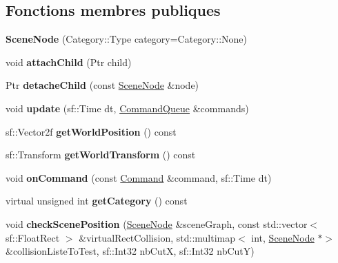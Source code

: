\subsection*{Fonctions membres publiques}
\begin{DoxyCompactItemize}
\item 
\hypertarget{class_scene_node_ae6066cf0e6c0bddbc06e6d09bac918e9}{}\label{class_scene_node_ae6066cf0e6c0bddbc06e6d09bac918e9} 
{\bfseries Scene\+Node} (Category\+::\+Type category=Category\+::\+None)
\item 
\hypertarget{class_scene_node_acdfa2c2ba28bce076c886eaba2d9e650}{}\label{class_scene_node_acdfa2c2ba28bce076c886eaba2d9e650} 
void {\bfseries attach\+Child} (Ptr child)
\item 
\hypertarget{class_scene_node_a96fce79b962e56cf269a905c52daeb49}{}\label{class_scene_node_a96fce79b962e56cf269a905c52daeb49} 
Ptr {\bfseries detache\+Child} (const \hyperlink{class_scene_node}{Scene\+Node} \&node)
\item 
\hypertarget{class_scene_node_a5494c3a380d7ea5ae7148122c4255400}{}\label{class_scene_node_a5494c3a380d7ea5ae7148122c4255400} 
void {\bfseries update} (sf\+::\+Time dt, \hyperlink{class_command_queue}{Command\+Queue} \&commands)
\item 
\hypertarget{class_scene_node_a43061f972f26184b271e6c56723a29c2}{}\label{class_scene_node_a43061f972f26184b271e6c56723a29c2} 
sf\+::\+Vector2f {\bfseries get\+World\+Position} () const
\item 
\hypertarget{class_scene_node_aedae712e618334745fea3c934d51a390}{}\label{class_scene_node_aedae712e618334745fea3c934d51a390} 
sf\+::\+Transform {\bfseries get\+World\+Transform} () const
\item 
\hypertarget{class_scene_node_af6f126fe8727414a0c967f84f9754968}{}\label{class_scene_node_af6f126fe8727414a0c967f84f9754968} 
void {\bfseries on\+Command} (const \hyperlink{struct_command}{Command} \&command, sf\+::\+Time dt)
\item 
\hypertarget{class_scene_node_af713a8c58831a27bc791a2efdfb7c495}{}\label{class_scene_node_af713a8c58831a27bc791a2efdfb7c495} 
virtual unsigned int {\bfseries get\+Category} () const
\item 
\hypertarget{class_scene_node_a72d7417aeb5aa2ecb96992229db096ca}{}\label{class_scene_node_a72d7417aeb5aa2ecb96992229db096ca} 
void {\bfseries check\+Scene\+Position} (\hyperlink{class_scene_node}{Scene\+Node} \&scene\+Graph, const std\+::vector$<$ sf\+::\+Float\+Rect $>$ \&virtual\+Rect\+Collision, std\+::multimap$<$ int, \hyperlink{class_scene_node}{Scene\+Node} $\ast$$>$ \&collision\+Liste\+To\+Test, sf\+::\+Int32 nb\+CutX, sf\+::\+Int32 nb\+CutY)
$$
\end{DoxyCompactItemize}
